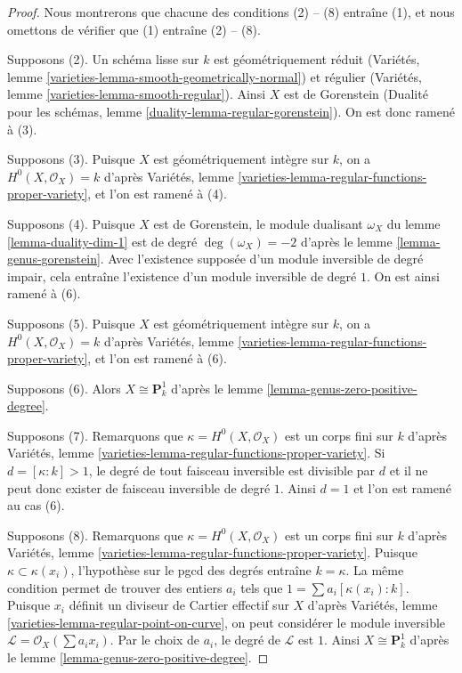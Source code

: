\begin{proof}
Nous montrerons que chacune des conditions (2) -- (8) entraîne (1), et nous omettons de vérifier que (1) entraîne (2) -- (8).

\medskip\noindent
Supposons (2). Un schéma lisse sur $k$ est géométriquement réduit (Variétés, lemme \ref{varieties-lemma-smooth-geometrically-normal}) et régulier (Variétés, lemme \ref{varieties-lemma-smooth-regular}). Ainsi $X$ est de Gorenstein (Dualité pour les schémas, lemme \ref{duality-lemma-regular-gorenstein}). On est donc ramené à (3).

\medskip\noindent
Supposons (3). Puisque $X$ est géométriquement intègre sur $k$, on a $H^0(X, \mathcal{O}_X) = k$ d'après Variétés, lemme \ref{varieties-lemma-regular-functions-proper-variety}, et l'on est ramené à (4).

\medskip\noindent
Supposons (4). Puisque $X$ est de Gorenstein, le module dualisant $\omega_X$ du lemme \ref{lemma-duality-dim-1} est de degré $\deg(\omega_X) = -2$ d'après le lemme \ref{lemma-genus-gorenstein}. Avec l'existence supposée d'un module inversible de degré impair, cela entraîne l'existence d'un module inversible de degré $1$. On est ainsi ramené à (6).

\medskip\noindent
Supposons (5). Puisque $X$ est géométriquement intègre sur $k$, on a $H^0(X, \mathcal{O}_X) = k$ d'après Variétés, lemme \ref{varieties-lemma-regular-functions-proper-variety}, et l'on est ramené à (6).

\medskip\noindent
Supposons (6). Alors $X \cong \mathbf{P}^1_k$ d'après le lemme \ref{lemma-genus-zero-positive-degree}.

\medskip\noindent
Supposons (7). Remarquons que $\kappa = H^0(X, \mathcal{O}_X)$ est un corps fini sur $k$ d'après Variétés, lemme \ref{varieties-lemma-regular-functions-proper-variety}. Si $d = [\kappa : k] > 1$, le degré de tout faisceau inversible est divisible par $d$ et il ne peut donc exister de faisceau inversible de degré $1$. Ainsi $d = 1$ et l'on est ramené au cas (6).

\medskip\noindent
Supposons (8). Remarquons que $\kappa = H^0(X, \mathcal{O}_X)$ est un corps fini sur $k$ d'après Variétés, lemme \ref{varieties-lemma-regular-functions-proper-variety}. Puisque $\kappa \subset \kappa(x_i)$, l'hypothèse sur le pgcd des degrés entraîne $k = \kappa$. La même condition permet de trouver des entiers $a_i$ tels que $1 = \sum a_i[\kappa(x_i) : k]$. Puisque $x_i$ définit un diviseur de Cartier effectif sur $X$ d'après Variétés, lemme \ref{varieties-lemma-regular-point-on-curve}, on peut considérer le module inversible $\mathcal{L} = \mathcal{O}_X(\sum a_i x_i)$. Par le choix de $a_i$, le degré de $\mathcal{L}$ est $1$. Ainsi $X \cong \mathbf{P}^1_k$ d'après le lemme \ref{lemma-genus-zero-positive-degree}.
\end{proof}

